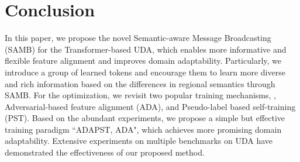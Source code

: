 \documentclass[journal]{IEEEtran}
\begin{document}
\section{Conclusion}
\label{sec:conlusion}
 In this paper, we propose the novel Semantic-aware Message Broadcasting (SAMB) for the Transformer-based UDA, which enables more informative and flexible feature alignment and improves domain adaptability. Particularly, we introduce a group of learned tokens and encourage them to learn more diverse and rich information based on the differences in regional semantics through SAMB. For the optimization, we revisit two popular training mechanisms, \ieno, Adversarial-based feature alignment (ADA), and Pseudo-label based self-training (PST). Based on the abundant experiments, we propose a simple but effective training paradigm ``ADAPST, ADA", which achieves more promising domain adaptability. Extensive experiments on multiple benchmarks on UDA have demonstrated the effectiveness of our proposed method.




















































\end{document}
